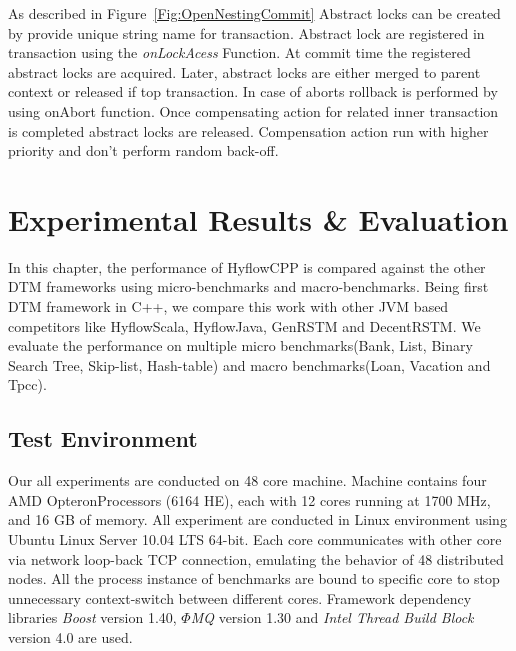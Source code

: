 \documentclass[12pt,english]{report}
\begin{document}
As described in Figure~\ref{Fig:OpenNestingCommit} Abstract locks can be created by provide unique string name for transaction. Abstract lock are registered in transaction using the \textit{onLockAcess} Function. At commit time the registered abstract locks are acquired. Later, abstract locks are either merged to parent context or released if top transaction. In case of aborts rollback is performed by using onAbort function. Once compensating action for related inner transaction is completed abstract locks are released. Compensation action run with higher priority and don't perform random back-off.   


\chapter{Experimental Results \& Evaluation}\label{chap:expResults}

In this chapter, the performance of HyflowCPP is compared against the other DTM frameworks using micro-benchmarks and macro-benchmarks. Being first DTM framework in C++, we compare this work with other JVM based competitors like HyflowScala, HyflowJava, GenRSTM and DecentRSTM. We evaluate the performance on multiple micro benchmarks(Bank, List, Binary Search Tree, Skip-list, Hash-table) and  macro benchmarks(Loan, Vacation and Tpcc).   

\section{Test Environment}

Our all experiments are conducted on 48 core machine. Machine contains four AMD Opteron\texttrademark  Processors (6164 HE), each with 12 cores running at 1700 MHz, and 16 GB of memory. All experiment are conducted in Linux environment using Ubuntu Linux Server 10.04 LTS 64-bit.  Each core communicates with other core via network loop-back TCP connection, emulating the behavior of 48 distributed nodes. All the process instance of benchmarks are bound to specific core to stop unnecessary context-switch between different cores. Framework dependency libraries \textit{Boost} version 1.40, \textit{$\Phi$MQ} version 1.30 and \textit{Intel Thread Build Block} version 4.0 are used.  
\end{document}
